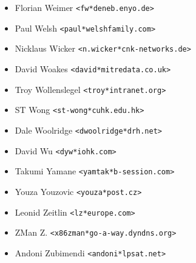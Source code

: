 \documentclass[a4paper,titlepage,12pt]{article}
\newcommand{\email}[1]{\texttt{#1}}
\begin{document}
\begin{itemize}
	\item Florian Weimer \email{<fw*deneb.enyo.de>}
	\item Paul Welsh \email{<paul*welshfamily.com>}
	\item Nicklaus Wicker \email{<n.wicker*cnk-networks.de>}
	\item David Woakes \email{<david*mitredata.co.uk>}
	\item Troy Wollenslegel \email{<troy*intranet.org>}
	\item ST Wong \email{<st-wong*cuhk.edu.hk>}
	\item Dale Woolridge \email{<dwoolridge*drh.net>}
	\item David Wu \email{<dyw*iohk.com>}
	\item Takumi Yamane \email{<yamtak*b-session.com>}
	\item Youza Youzovic \email{<youza*post.cz>}
	\item Leonid Zeitlin \email{<lz*europe.com>}
	\item ZMan Z. \email{<x86zman*go-a-way.dyndns.org>}
	\item Andoni Zubimendi \email{<andoni*lpsat.net>}
    \end{itemize}
\end{document}
